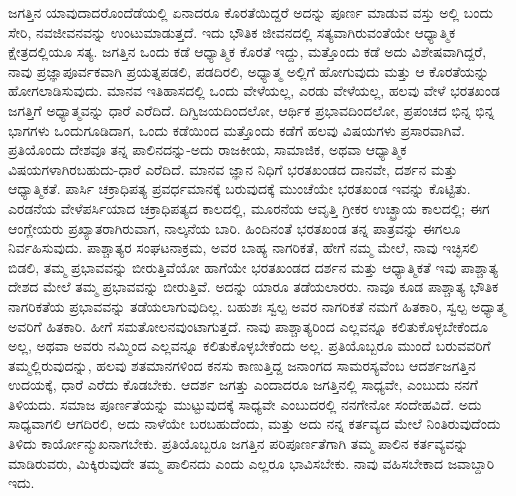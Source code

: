 ಜಗತ್ತಿನ ಯಾವುದಾದರೊಂದೆಡೆಯಲ್ಲಿ ಏನಾದರೂ ಕೊರತೆಯಿದ್ದರೆ ಅದನ್ನು ಪೂರ್ಣ ಮಾಡುವ ವಸ್ತು ಅಲ್ಲಿ ಬಂದು ಸೇರಿ, ನವಜೀವನವನ್ನು ಉಂಟುಮಾಡುತ್ತದೆ. ಇದು ಭೌತಿಕ ಜೀವನದಲ್ಲಿ ಸತ್ಯವಾಗಿರುವಂತೆಯೇ ಆಧ್ಯಾತ್ಮಿಕ ಕ್ಷೇತ್ರದಲ್ಲಿಯೂ ಸತ್ಯ. ಜಗತ್ತಿನ ಒಂದು ಕಡೆ ಆಧ್ಯಾತ್ಮಿಕ ಕೊರತೆ ಇದ್ದು, ಮತ್ತೊಂದು ಕಡೆ ಅದು ವಿಶೇಷವಾಗಿದ್ದರೆ, ನಾವು ಪ್ರಜ್ಞಾಪೂರ್ವಕವಾಗಿ ಪ್ರಯತ್ನಪಡಲಿ, ಪಡದಿರಲಿ, ಅಧ್ಯಾತ್ಮ ಅಲ್ಲಿಗೆ ಹೋಗುವುದು ಮತ್ತು ಆ ಕೊರತೆಯನ್ನು ಹೋಗಲಾಡಿಸುವುದು. ಮಾನವ ಇತಿಹಾಸದಲ್ಲಿ ಒಂದು ವೇಳೆಯಲ್ಲ, ಎರಡು ವೇಳೆಯಲ್ಲ, ಹಲವು ವೇಳೆ ಭರತಖಂಡ ಜಗತ್ತಿಗೆ ಅಧ್ಯಾತ್ಮವನ್ನು ಧಾರೆ ಎರೆದಿದೆ. ದಿಗ್ವಿಜಯದಿಂದಲೋ, ಆರ್ಥಿಕ ಪ್ರಭಾವದಿಂದಲೋ, ಪ್ರಪಂಚದ ಭಿನ್ನ ಭಿನ್ನ ಭಾಗಗಳು ಒಂದುಗೂಡಿದಾಗ, ಒಂದು ಕಡೆಯಿಂದ ಮತ್ತೊಂದು ಕಡೆಗೆ ಹಲವು ವಿಷಯಗಳು ಪ್ರಸಾರವಾಗಿವೆ. ಪ್ರತಿಯೊಂದು ದೇಶವೂ ತನ್ನ ಪಾಲಿನದನ್ನು-ಅದು ರಾಜಕೀಯ, ಸಾಮಾಜಿಕ, ಅಥವಾ ಆಧ್ಯಾತ್ಮಿಕ ವಿಷಯಗಳಾಗಿರಬಹುದು-ಧಾರೆ ಎರೆದಿದೆ. ಮಾನವ ಜ್ಞಾನ ನಿಧಿಗೆ ಭರತಖಂಡದ ದಾನವೇ, ದರ್ಶನ ಮತ್ತು ಆಧ್ಯಾತ್ಮಿಕತೆ. ಪಾರ್ಸಿ ಚಕ್ರಾಧಿಪತ್ಯ ಪ್ರವರ್ಧ\-ಮಾನಕ್ಕೆ ಬರುವುದಕ್ಕೆ ಮುಂಚೆಯೇ ಭರತಖಂಡ ಇವನ್ನು ಕೊಟ್ಟಿತು. ಎರಡನೆಯ ವೇಳೆ\break ಪರ್ಸಿಯಾದ ಚಕ್ರಾಧಿಪತ್ಯದ ಕಾಲದಲ್ಲಿ, ಮೂರನೆಯ ಆವೃತ್ತಿ ಗ್ರೀಕರ ಉಚ್ಛ್ರಾಯ ಕಾಲದಲ್ಲಿ; ಈಗ ಆಂಗ್ಲೇಯರು ಪ್ರಖ್ಯಾತರಾಗಿರುವಾಗ, ನಾಲ್ಕನೆಯ ಬಾರಿ. ಹಿಂದಿನಂತೆ ಭರತಖಂಡ ತನ್ನ ಪಾತ್ರವನ್ನು ಈಗಲೂ ನಿರ್ವಹಿಸುವುದು. ಪಾಶ್ಚಾತ್ಯರ ಸಂಘಟನಾಕ್ರಮ, ಅವರ ಬಾಹ್ಯ ನಾಗರಿಕತೆ, ಹೇಗೆ ನಮ್ಮ ಮೇಲೆ, ನಾವು ಇಚ್ಛಿಸಲಿ ಬಿಡಲಿ, ತಮ್ಮ ಪ್ರಭಾವವನ್ನು ಬೀರುತ್ತಿವೆಯೋ ಹಾಗೆಯೇ ಭರತಖಂಡದ ದರ್ಶನ ಮತ್ತು ಆಧ್ಯಾತ್ಮಿಕತೆ ಇವು ಪಾಶ್ಚಾತ್ಯ ದೇಶದ ಮೇಲೆ ತಮ್ಮ ಪ್ರಭಾವವನ್ನು ಬೀರುತ್ತಿವೆ. ಅದನ್ನು ಯಾರೂ ತಡೆಯಲಾರರು. ನಾವೂ ಕೂಡ ಪಾಶ್ಚಾತ್ಯ ಭೌತಿಕ ನಾಗರಿಕತೆಯ ಪ್ರಭಾವವನ್ನು ತಡೆಯಲಾಗುವುದಿಲ್ಲ. ಬಹುಶಃ ಸ್ವಲ್ಪ ಅವರ ನಾಗರಿಕತೆ ನಮಗೆ ಹಿತಕಾರಿ, ಸ್ವಲ್ಪ ಅಧ್ಯಾತ್ಮ ಅವರಿಗೆ ಹಿತಕಾರಿ. ಹೀಗೆ ಸಮತೋಲನವುಂಟಾಗುತ್ತದೆ. ನಾವು ಪಾಶ್ಚಾತ್ಯರಿಂದ ಎಲ್ಲವನ್ನೂ ಕಲಿತುಕೊಳ್ಳಬೇಕೆಂದೂ ಅಲ್ಲ, ಅಥವಾ ಅವರು ನಮ್ಮಿಂದ ಎಲ್ಲವನ್ನೂ ಕಲಿತುಕೊಳ್ಳಬೇಕೆಂದು ಅಲ್ಲ. ಪ್ರತಿಯೊಬ್ಬರೂ ಮುಂದೆ ಬರುವವರಿಗೆ ತಮ್ಮಲ್ಲಿರುವುದನ್ನು, ಹಲವು ಶತಮಾನಗಳಿಂದ ಕನಸು ಕಾಣುತ್ತಿದ್ದ ಜನಾಂಗದ ಸಾಮರಸ್ಯವೆಂಬ ಆದರ್ಶಜಗತ್ತಿನ ಉದಯಕ್ಕೆ, ಧಾರೆ ಎರೆದು ಕೊಡಬೇಕು. ಆದರ್ಶ ಜಗತ್ತು ಎಂದಾದರೂ ಜಗತ್ತಿನಲ್ಲಿ ಸಾಧ್ಯವೇ, ಎಂಬುದು ನನಗೆ ತಿಳಿಯದು. ಸಮಾಜ ಪೂರ್ಣತೆಯನ್ನು ಮುಟ್ಟುವುದಕ್ಕೆ ಸಾಧ್ಯವೇ ಎಂಬುದರಲ್ಲಿ ನನಗೇನೋ ಸಂದೇಹವಿದೆ. ಅದು ಸಾಧ್ಯವಾಗಲಿ ಆಗದಿರಲಿ, ಅದು ನಾಳೆಯೇ ಬರಬಹುದೆಂದು, ಮತ್ತು ಅದು ನನ್ನ ಕರ್ತವ್ಯದ ಮೇಲೆ ನಿಂತಿರುವುದೆಂದು ತಿಳಿದು ಕಾರ್ಯೋನ್ಮುಖನಾಗಬೇಕು. ಪ್ರತಿಯೊಬ್ಬರೂ ಜಗತ್ತಿನ ಪರಿಪೂರ್ಣತೆಗಾಗಿ ತಮ್ಮ ಪಾಲಿನ ಕರ್ತವ್ಯವನ್ನು ಮಾಡಿರುವರು, ಮಿಕ್ಕಿರುವುದೇ ತಮ್ಮ ಪಾಲಿನದು ಎಂದು ಎಲ್ಲರೂ ಭಾವಿಸಬೇಕು. ನಾವು ವಹಿಸಬೇಕಾದ ಜವಾಬ್ದಾರಿ ಇದು.

